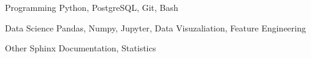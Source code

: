 

\begin{cvskills}

  \cvskill
    {Programming} %
    {Python, PostgreSQL, Git, Bash} %

  \cvskill
    {Data Science} %
    {Pandas, Numpy, Jupyter, Data Visuzaliation, Feature Engineering} %

  \cvskill
    {Other} %
    {Sphinx Documentation, Statistics} %

\end{cvskills}
